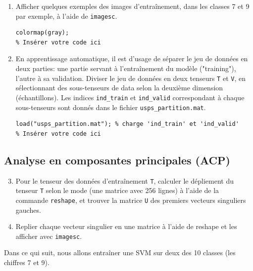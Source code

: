 \begin{enumerate}
	\item Afficher quelques exemples des images d'entraînement, dans les classes 7 et 9 par exemple, à l'aide de \texttt{imagesc}.
\begin{lstlisting}
colormap(gray);
% Insérer votre code ici
\end{lstlisting}

	\item En apprentissage automatique, il est d'usage de séparer le jeu de données en deux parties: une partie servant à l'entraînement du modèle ("training"), l'autre à sa validation. Diviser le jeu de données en deux tenseurs \texttt{T} et \texttt{V}, en sélectionnant des sous-tenseurs de data selon la deuxième dimension (échantillons). Les indices \texttt{ind\_train} et \texttt{ind\_valid} correspondant à chaque sous-tenseurs sont donnés dans le fichier \texttt{usps\_partition.mat}.
\begin{lstlisting}
load("usps_partition.mat"); % charge 'ind_train' et 'ind_valid'
% Insérer votre code ici
\end{lstlisting}
\end{enumerate}

\subsection{Analyse en composantes principales (ACP)}

\begin{enumerate}
\setcounter{enumi}{2}
\item Pour le tenseur des données d'entraînement \texttt{T}, calculer le dépliement du tenseur \texttt{T} selon le mode  (une matrice avec 256 lignes) à l'aide de la commande \texttt{reshape}, et trouver la matrice \texttt{U} des  premiers vecteurs singuliers gauches.

\item Replier chaque vecteur singulier en une matrice  à l'aide de reshape et les afficher avec \texttt{imagesc}.
\end{enumerate}

Dans ce qui suit, nous allons entraîner une SVM sur deux des 10 classes (les chiffres 7 et 9).

